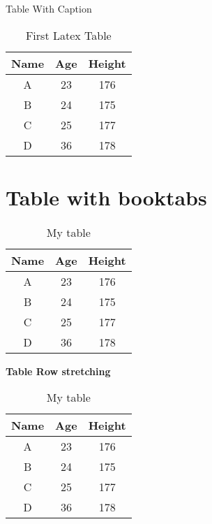 \documentclass[a4paper, 12pt]{article}
\begin{document}
	Table With Caption
	\begin{table}[h]
		\centering
		\caption{First Latex Table}
		\begin{tabular}{|c|c|c|}
			\hline
			Name & Age & Height\\ \hline
			A  & 23 & 176 \\ \hline
			B  & 24 & 175 \\ \hline
			C  & 25 & 177\\ \hline
			D  & 36 & 178 \\ \hline
		\end{tabular}
	\end{table}

	\newpage
	\section{\centering Table with booktabs}
	\begin{table}[h]
		\centering\caption{My table}
		\begin{tabular}{c|c|c}
			\toprule[2pt]
			Name & Age & Height\\ 
			\midrule[1.5pt]
			A  & 23 & 176 \\ \midrule
			B  & 24 & 175 \\ \midrule
			C  & 25 & 177\\ \midrule
			D  & 36 & 178 \\ 
			\bottomrule[1.5pt]
		\end{tabular}
	\end{table}     
	
	\newpage
	
	\begin{table}[h]
		\centering\textbf{Table Row stretching}
		\centering\caption{My table}
		{
			\renewcommand{\arraystretch}{2}
			
			\begin{tabular}{c|c|c}
				\toprule[2pt]
				Name & Age & Height\\ 
				\midrule[1.5pt]
				A  & 23 & 176 \\ \midrule
				B  & 24 & 175 \\ \midrule
				C  & 25 & 177\\ \midrule
				D  & 36 & 178 \\ 
				\bottomrule[1.5pt]
			\end{tabular}
		}
	\end{table} 
	
\end{document}
